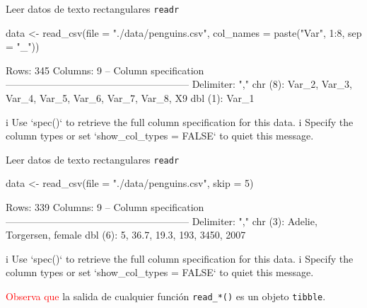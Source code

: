\documentclass[
  ignorenonframetext,
  aspectratio=169]{beamer}
\newenvironment{Shaded}{\begin{snugshade}}{\end{snugshade}}
\newcommand{\AttributeTok}[1]{\textcolor[rgb]{0.77,0.63,0.00}{#1}}
\newcommand{\DecValTok}[1]{\textcolor[rgb]{0.00,0.00,0.81}{#1}}
\newcommand{\FunctionTok}[1]{\textcolor[rgb]{0.00,0.00,0.00}{#1}}
\newcommand{\NormalTok}[1]{#1}
\newcommand{\OtherTok}[1]{\textcolor[rgb]{0.56,0.35,0.01}{#1}}
\newcommand{\SpecialCharTok}[1]{\textcolor[rgb]{0.00,0.00,0.00}{#1}}
\newcommand{\StringTok}[1]{\textcolor[rgb]{0.31,0.60,0.02}{#1}}
\let\oldverbatim\verbatim
\let\endoldverbatim\endverbatim
\renewenvironment{verbatim}{\tiny\oldverbatim}{\endoldverbatim}
\newcommand\red[1]{\textcolor{red}{#1}}
\begin{document}
\begin{frame}[fragile]{Leer datos de texto rectangulares \texttt{readr}}
\protect\hypertarget{leer-datos-de-texto-rectangulares-readr-3}{}
\begin{Shaded}
\begin{Highlighting}[]
\NormalTok{data }\OtherTok{\textless{}{-}} \FunctionTok{read\_csv}\NormalTok{(}\AttributeTok{file =} \StringTok{"./data/penguins.csv"}\NormalTok{,}
                 \AttributeTok{col\_names =} \FunctionTok{paste}\NormalTok{(}\StringTok{"Var"}\NormalTok{, }\DecValTok{1}\SpecialCharTok{:}\DecValTok{8}\NormalTok{, }\AttributeTok{sep =} \StringTok{"\_"}\NormalTok{))}
\end{Highlighting}
\end{Shaded}

\begin{verbatim}
Rows: 345 Columns: 9
-- Column specification --------------------------------------------------------
Delimiter: ","
chr (8): Var_2, Var_3, Var_4, Var_5, Var_6, Var_7, Var_8, X9
dbl (1): Var_1

i Use `spec()` to retrieve the full column specification for this data.
i Specify the column types or set `show_col_types = FALSE` to quiet this message.
\end{verbatim}
\end{frame}

\begin{frame}[fragile]{Leer datos de texto rectangulares \texttt{readr}}
\protect\hypertarget{leer-datos-de-texto-rectangulares-readr-4}{}
\begin{Shaded}
\begin{Highlighting}[]
\NormalTok{data }\OtherTok{\textless{}{-}} \FunctionTok{read\_csv}\NormalTok{(}\AttributeTok{file =} \StringTok{"./data/penguins.csv"}\NormalTok{, }\AttributeTok{skip =} \DecValTok{5}\NormalTok{)}
\end{Highlighting}
\end{Shaded}

\begin{verbatim}
Rows: 339 Columns: 9
-- Column specification --------------------------------------------------------
Delimiter: ","
chr (3): Adelie, Torgersen, female
dbl (6): 5, 36.7, 19.3, 193, 3450, 2007

i Use `spec()` to retrieve the full column specification for this data.
i Specify the column types or set `show_col_types = FALSE` to quiet this message.
\end{verbatim}

\hfill\break

\red{Observa que} la salida de cualquier función \texttt{read\_*()} es
un objeto \texttt{tibble}.
\end{frame}
\end{document}

